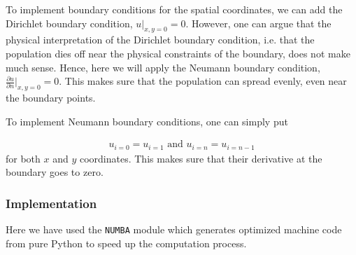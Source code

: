 To implement boundary conditions for the spatial coordinates, we can add the Dirichlet boundary condition, $u|_{x,y=0}=0$. However, one can argue that the physical interpretation of the Dirichlet boundary condition, i.e. that the population dies off near the physical constraints of the boundary, does not make much sense. Hence, here we will apply the Neumann boundary condition, $\frac{\partial u}{\partial n}\big| _{x,y=0} = 0$. This makes sure that the population can spread evenly, even near the boundary points.

To implement Neumann boundary conditions, one can simply put

\begin{align}
    u_{i=0} = u_{i=1} \text{ and } u_{i=n} = u_{i=n-1}
\end{align}
for both $x$ and $y$ coordinates. This makes sure that their derivative at the boundary goes to zero.

\subsubsection{Implementation}

Here we have used the \verb|NUMBA| module which generates optimized machine code from pure Python to speed up the computation process.\\

